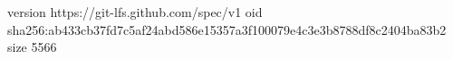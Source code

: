 version https://git-lfs.github.com/spec/v1
oid sha256:ab433cb37fd7c5af24abd586e15357a3f100079e4c3e3b8788df8c2404ba83b2
size 5566
